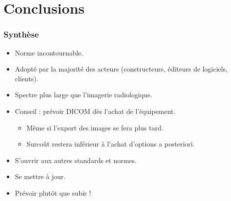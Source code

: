 \section{Conclusions}

\frame
{
	\frametitle{Synth\`ese}
	
	\begin{itemize}
		\item Norme incontournable.
		\item Adopt\'e par la majorit\'e des acteurs (constructeurs, \'editeurs de logiciels, clients).
		\item Spectre plus large que l'imagerie radiologique.
		\item Conseil : pr\'evoir DICOM d\`es l'achat de l'\'equipement.
		\begin{itemize}
			\item M\^eme si l'export des images se fera plus tard.
			\item Surco\^ut restera inf\'erieur \`a l'achat d'options a posteriori.
		\end{itemize}
		\item S'ouvrir aux autres standards et normes.
		\item Se mettre \`a jour. 
		\item Pr\'evoir plut\^ot que subir !
	\end{itemize}
}
